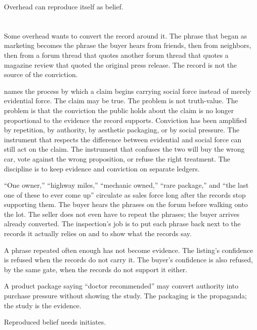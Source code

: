 Overhead can reproduce itself as belief.

\section{}
\label{se:propaganda}

Some overhead wants to convert the record around it. The phrase that
began as marketing becomes the phrase the buyer hears from friends,
then from neighbors, then from a forum thread that quotes another
forum thread that quotes a magazine review that quoted the original
press release. The record is not the source of the conviction.

 names the process by which a claim begins carrying
social force instead of merely evidential force. The claim may be
true. The problem is not truth-value. The problem is that the
conviction the public holds about the claim is no longer proportional
to the evidence the record supports. Conviction has been amplified by
repetition, by authority, by aesthetic packaging, or by social
pressure. The instrument that respects the difference between
evidential and social force can still act on the claim. The instrument
that confuses the two will buy the wrong car, vote against the wrong
proposition, or refuse the right treatment. The discipline is to keep
evidence and conviction on separate ledgers.

``One owner,'' ``highway miles,'' ``mechanic owned,'' ``rare package,''
and ``the last one of these to ever come up'' circulate as sales force
long after the records stop supporting them. The buyer hears the
phrases on the forum before walking onto the lot. The seller does not
even have to repeat the phrases; the buyer arrives already converted.
The inspection's job is to put each phrase back next to the records it
actually relies on and to show what the records say.

A phrase repeated often enough has not become evidence. The listing's
confidence is refused when the records do not carry it. The buyer's
confidence is also refused, by the same gate, when the records do not
support it either.

A product package saying ``doctor recommended'' may convert authority
into purchase pressure without showing the study. The packaging is the
propaganda; the study is the evidence.

Reproduced belief needs initiates.

\section{}
\label{se:acolyte}

